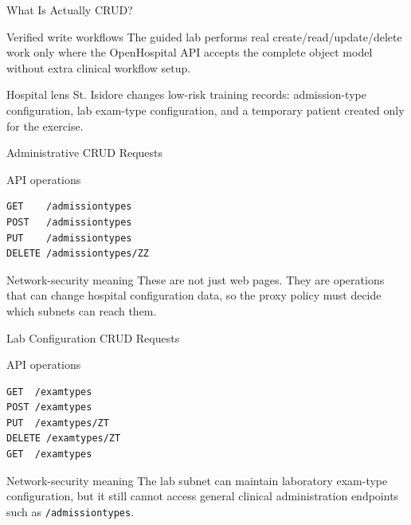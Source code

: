\documentclass[presentation]{beamer}
\begin{document}
\begin{frame}[c]{What Is Actually CRUD?}
\begin{block}{Verified write workflows}
The guided lab performs real create/read/update/delete work only where the OpenHospital API accepts
the complete object model without extra clinical workflow setup.
\end{block}

\begin{exampleblock}{Hospital lens}
St. Isidore changes low-risk training records: admission-type configuration, lab exam-type
configuration, and a temporary patient created only for the exercise.
\end{exampleblock}
\end{frame}

\begin{frame}[fragile,c]{Administrative CRUD Requests}
\small
\begin{block}{API operations}
\begin{verbatim}
GET    /admissiontypes
POST   /admissiontypes
PUT    /admissiontypes
DELETE /admissiontypes/ZZ
\end{verbatim}
\end{block}

\begin{exampleblock}{Network-security meaning}
These are not just web pages. They are operations that can change hospital configuration data, so
the proxy policy must decide which subnets can reach them.
\end{exampleblock}
\end{frame}

\begin{frame}[fragile,c]{Lab Configuration CRUD Requests}
\small
\begin{block}{API operations}
\begin{verbatim}
GET  /examtypes
POST /examtypes
PUT  /examtypes/ZT
DELETE /examtypes/ZT
GET  /examtypes
\end{verbatim}
\end{block}

\begin{exampleblock}{Network-security meaning}
The lab subnet can maintain laboratory exam-type configuration, but it still cannot access general
clinical administration endpoints such as \texttt{/admissiontypes}.
\end{exampleblock}
\end{frame}
\end{document}
